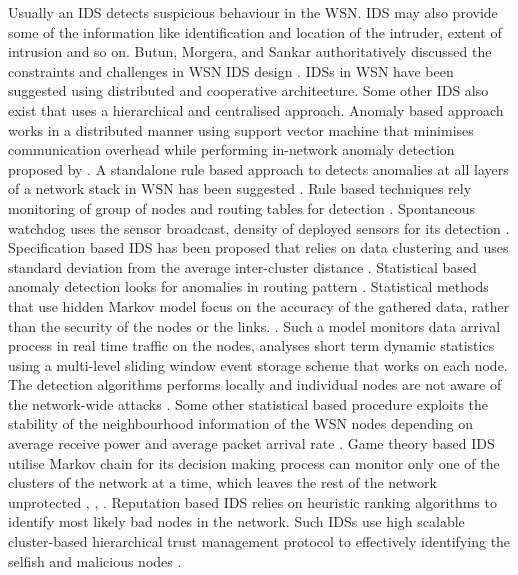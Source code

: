 \documentclass[conference,final]{IEEEtran}
\begin{document}
Usually an IDS detects suspicious behaviour in the WSN.
IDS may also provide some of the information like identification and location of the intruder, extent of intrusion and so on.
Butun, Morgera, and Sankar authoritatively discussed the constraints and challenges in WSN IDS design \cite{6517052}.
IDSs in WSN have been suggested using distributed and cooperative architecture. 
Some other IDS also exist that  uses a  hierarchical and centralised approach.
Anomaly based approach works in a distributed manner using support vector machine that minimises communication overhead while performing in-network anomaly detection proposed by \cite{ISI:000257882502160}.
A standalone rule based approach to detects anomalies at all layers of a network stack in WSN has been suggested \cite{ISI:000232429900067}.
Rule based  techniques rely  monitoring of group of nodes and routing tables for detection \cite{ISI:000298891500099, Chen:2009:NMI:1516241.1516282, 1424814, Strikos_afull}.
Spontaneous watchdog uses the sensor broadcast, density of deployed sensors for its detection \cite{1593102}.
Specification based  IDS has been proposed that relies on data clustering and uses standard deviation from the average inter-cluster distance \cite{Chen:2009:NMI:1516241.1516282, 1424814, Strikos_afull, 4085803}. 
Statistical based anomaly  detection looks for anomalies in routing pattern \cite{4024996}.
Statistical methods that use hidden Markov model focus on the accuracy of the gathered data, rather than the security of the nodes or the links.  \cite{1290173}.
Such a model monitors data arrival process in real time traffic on the nodes, analyses short term dynamic statistics using a multi-level sliding window event storage scheme that works on each node. The detection algorithms performs locally and individual nodes are not aware of the network-wide attacks \cite{1515559}.
Some other statistical based procedure exploits the stability of the neighbourhood information of the WSN nodes depending on average receive power and average packet arrival rate \cite{1512911}.
Game theory based IDS utilise Markov chain for its decision making process can monitor only one of the clusters of the network at a time, which leaves the rest of the network unprotected \cite{1347798}, \cite{Das07preventingdos}, \cite{Reddy:2009:GTA:1607720.1607944}.
Reputation based IDS relies on heuristic ranking algorithms to identify most likely bad nodes in the network.
Such IDSs use high scalable cluster-based hierarchical trust management protocol to effectively identifying the selfish and malicious nodes \cite{6174485}.
\end{document}

